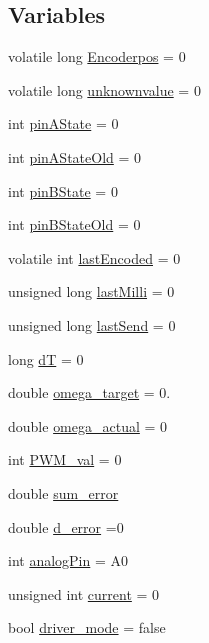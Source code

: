 \subsection*{Variables}
\begin{DoxyCompactItemize}
\item 
volatile long \hyperlink{vnh5019__base_8ino_af08dd316e464764c0c1b9309c0ee1178}{Encoderpos} = 0
\item 
volatile long \hyperlink{vnh5019__base_8ino_ac115c3310c199c83a39f45c3e93bc301}{unknownvalue} = 0
\item 
int \hyperlink{vnh5019__base_8ino_a06951904ea6405c34f6907a21029e7bd}{pin\-A\-State} = 0
\item 
int \hyperlink{vnh5019__base_8ino_ac32c5937b2b49373bb87d5ff44a7f5a4}{pin\-A\-State\-Old} = 0
\item 
int \hyperlink{vnh5019__base_8ino_a84411918f648f20ebdea7b595119d6c3}{pin\-B\-State} = 0
\item 
int \hyperlink{vnh5019__base_8ino_a45b9e8f07288b4c376bc371201517f54}{pin\-B\-State\-Old} = 0
\item 
volatile int \hyperlink{vnh5019__base_8ino_aa081167d5312d0401296be66da3dd143}{last\-Encoded} = 0
\item 
unsigned long \hyperlink{vnh5019__base_8ino_a2b6f843df774bbfddf1fd26e7f34eef9}{last\-Milli} = 0
\item 
unsigned long \hyperlink{vnh5019__base_8ino_a335590d77617aabb4d6d76a525d24b78}{last\-Send} = 0
\item 
long \hyperlink{vnh5019__base_8ino_a89e91c1611e6f2fe8107ff1611a14e21}{d\-T} = 0
\item 
double \hyperlink{vnh5019__base_8ino_ae2c6cf4309c90b1783edbdbbbc145322}{omega\-\_\-target} = 0.
\item 
double \hyperlink{vnh5019__base_8ino_a288bdf55021bb8c817ee1549059a9c48}{omega\-\_\-actual} = 0
\item 
int \hyperlink{vnh5019__base_8ino_a2ef5b99c30d589821194548c5fdb9d06}{P\-W\-M\-\_\-val} = 0
\item 
double \hyperlink{vnh5019__base_8ino_a3d180a8f5adc7d008e171cc57488eafd}{sum\-\_\-error}
\item 
double \hyperlink{vnh5019__base_8ino_aaf2b26aa1350b5de736daa6cd9b0bbaf}{d\-\_\-error} =0
\item 
int \hyperlink{vnh5019__base_8ino_ac980a12cabd1d7c5bde8f3b443d0c164}{analog\-Pin} = A0
\item 
unsigned int \hyperlink{vnh5019__base_8ino_ae5102c5e4d522765c36ee5a44a750d9a}{current} = 0
\item 
bool \hyperlink{vnh5019__base_8ino_a7665ecebce28154b224aa5652bff1a64}{driver\-\_\-mode} = false
\end{DoxyCompactItemize}


